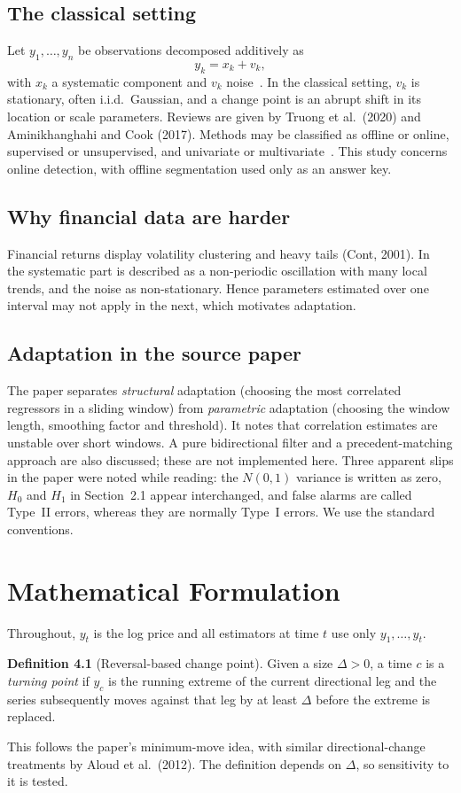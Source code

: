 \documentclass[12pt,a4paper]{report}
\theoremstyle{definition}\newtheorem{definition}{Definition}[chapter]
\begin{document}
\section{The classical setting}
Let $y_1,\dots,y_n$ be observations decomposed additively as
\begin{equation}y_k=x_k+v_k,\label{eq:model}\end{equation}
with $x_k$ a systematic component and $v_k$ noise~\cite{musaev2024}. In the classical setting, $v_k$ is stationary, often i.i.d.\ Gaussian, and a change point is an abrupt shift in its location or scale parameters. Reviews are given by Truong et al.\ (2020) and Aminikhanghahi and Cook (2017). Methods may be classified as offline or online, supervised or unsupervised, and univariate or multivariate~\cite{musaev2024}. This study concerns online detection, with offline segmentation used only as an answer key.
\section{Why financial data are harder}
Financial returns display volatility clustering and heavy tails (Cont, 2001). In~\cite{musaev2024} the systematic part is described as a non-periodic oscillation with many local trends, and the noise as non-stationary. Hence parameters estimated over one interval may not apply in the next, which motivates adaptation.
\section{Adaptation in the source paper}
The paper separates \emph{structural} adaptation (choosing the most correlated regressors in a sliding window) from \emph{parametric} adaptation (choosing the window length, smoothing factor and threshold). It notes that correlation estimates are unstable over short windows. A pure bidirectional filter and a precedent-matching approach are also discussed; these are not implemented here. Three apparent slips in the paper were noted while reading: the $N(0,1)$ variance is written as zero, $H_0$ and $H_1$ in Section~2.1 appear interchanged, and false alarms are called Type~II errors, whereas they are normally Type~I errors. We use the standard conventions.

\chapter{Mathematical Formulation}\label{ch:maths}
Throughout, $y_t$ is the log price and all estimators at time $t$ use only $y_1,\dots,y_t$.
\begin{definition}[Reversal-based change point]
Given a size $\Delta>0$, a time $c$ is a \emph{turning point} if $y_c$ is the running extreme of the current directional leg and the series subsequently moves against that leg by at least $\Delta$ before the extreme is replaced.
\end{definition}
\noindent This follows the paper's minimum-move idea, with similar directional-change treatments by Aloud et al.\ (2012). The definition depends on $\Delta$, so sensitivity to it is tested.
\end{document}
